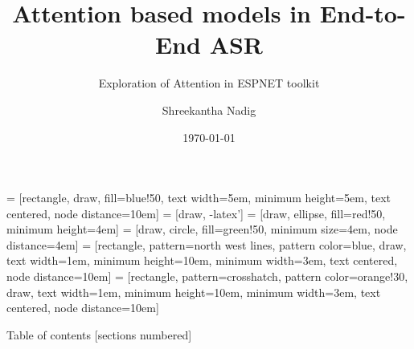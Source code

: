 \documentclass{beamer}
\title{Attention based models in End-to-End ASR}
\subtitle{Exploration of Attention in ESPNET toolkit}
\date{\today}
\author{Shreekantha Nadig}
\institute{International Institute of Information Technology - Bangalore}
\begin{document}
 = [rectangle, draw, fill=blue!50, text width=5em, minimum height=5em, text centered, node distance=10em]
 = [draw, -latex']
 = [draw, ellipse, fill=red!50, minimum height=4em]
 = [draw, circle, fill=green!50, minimum size=4em, node distance=4em]
 = [rectangle, pattern=north west lines, pattern color=blue, draw, text width=1em, minimum height=10em, minimum width=3em, text centered, node distance=10em]
 = [rectangle, pattern=crosshatch, pattern color=orange!30, draw, text width=1em, minimum height=10em, minimum width=3em, text centered, node distance=10em]
\maketitle


\begin{frame}{Table of contents}
	[sections numbered]
	\tableofcontents[hideallsubsections]
\end{frame}
\end{document}
